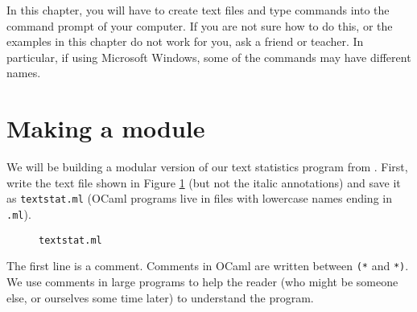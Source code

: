 \documentclass[]{book}
\begin{document}
In this chapter, you will have to create text files and type commands into the command prompt of your computer. If you are not sure how to do this, or the examples in this chapter do not work for you, ask a friend or teacher. In particular, if using Microsoft Windows, some of the commands may have different names.

\section*{Making a module}

We will be building a modular version of our text statistics program from . First, write the text file shown in Figure \ref{textstat.ml} (but not the italic annotations) and save it as \texttt{textstat.ml} (OCaml programs live in files with lowercase names ending in \texttt{.ml}).

\begin{figure}
\begin{center}
\end{center}
\caption{\small \texttt{textstat.ml}}
\label{textstat.ml}
\end{figure}

The first line is a comment. Comments in OCaml are written between \texttt{(*} and \texttt{*)}. We use comments in large programs to help the reader (who might be someone else, or ourselves some time later) to understand the program.
\end{document}
